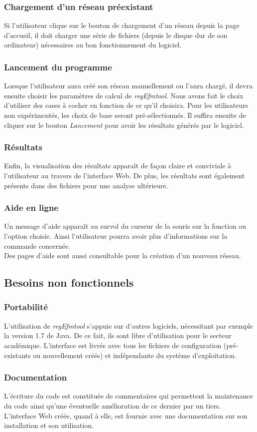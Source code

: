 \subsubsection{Chargement d'un réseau préexistant}
Si l'utilisateur clique sur le bouton de chargement d'un réseau depuis la page d'accueil, il doit charger une série de fichiers (depuis le disque dur de son ordinateur) nécessaires au bon fonctionnement du logiciel. 

\subsubsection{Lancement du programme}
Lorsque l'utilisateur aura créé son réseau manuellement ou l'aura chargé, il devra ensuite choisir les paramètres de calcul de \textit{regEfmtool}. Nous avons fait le choix d'utiliser des cases à cocher en fonction de ce qu'il choisira. Pour les utilisateurs non expérimentés, les choix de base seront pré-sélectionnés. Il suffira ensuite de cliquer sur le bouton \emph{Lancement} pour avoir les résultats générés par le logiciel.

\subsubsection{Résultats}
Enfin, la visualisation des résultats apparaît de façon claire et conviviale à l'utilisateur au travers de l'interface Web. De plus, les résultats sont également présents dans des fichiers pour une analyse ultérieure. %

\subsubsection{Aide en ligne}
Un message d'aide apparaît au survol du curseur de la souris sur la fonction ou l'option choisie. Ainsi l'utilisateur pourra avoir plus d'informations sur la commande concernée.\\
Des pages d'aide sont aussi consultable pour la création d'un nouveau réseau.


			
			
			
\subsection{Besoins non fonctionnels}

\subsubsection{Portabilité}
L'utilisation de \textit{regEfmtool} s'appuie sur d'autres logiciels, nécessitant par exemple la version 1.7 de Java. De ce fait, ils sont libre d'utilisation pour le secteur académique. L'interface est livrée avec tous les fichiers de configuration (pré-existants ou nouvellement créés) et indépendante du système d'exploitation. 

\subsubsection{Documentation}
L'écriture du code est constituée de commentaires qui permettent la maintenance du code ainsi qu'une éventuelle amélioration de ce dernier par un tiers.\\
L'interface Web créée, quand à elle, est fournie avec une documentation sur son installation et son utilisation.
